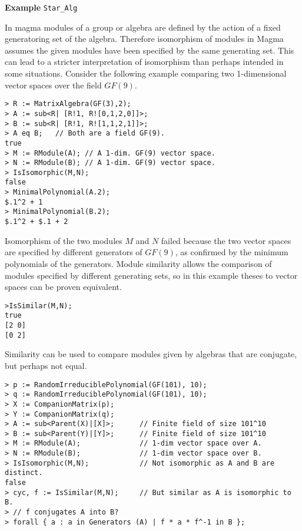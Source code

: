 \begin{framed}{\bf Example} {\tt Star\_Alg}\\
{\small 
In magma modules of a group or algebra are defined by the action of a fixed
generatoring set of the algebra.  Therefore isomorphism of modules in Magma 
assumes the given modules have been specified by the same generating set.
This can lead to a stricter interpretation of isomorphism than perhaps intended
in some situations.  Consider the following example comparing two
1-dimensional vector spaces over the field $GF(9)$.
\begin{lstlisting}[frame=single,basicstyle=\ttfamily\color{black!30!
teal},backgroundcolor=\color{white!70!gray}]
> R := MatrixAlgebra(GF(3),2);     
> A := sub<R| [R!1, R![0,1,2,0]]>;
> B := sub<R| [R!1, R![1,1,2,1]]>;
> A eq B;	// Both are a field GF(9).
true
> M := RModule(A); // A 1-dim. GF(9) vector space.
> N := RModule(B); // A 1-dim. GF(9) vector space.
> IsIsomorphic(M,N);
false
> MinimalPolynomial(A.2);
$.1^2 + 1
> MinimalPolynomial(B.2);
$.1^2 + $.1 + 2
\end{lstlisting}
Isomorphism of the two modules $M$ and $N$ failed because the two
vector spaces are specified by different generators of $GF(9)$, as confirmed
by the minimum polynomials of the generators.  Module similarity allows
the comparison of modules specified by different generating sets, so
in this example theses to vector spaces can be proven equivalent.
\begin{lstlisting}[frame=single,basicstyle=\ttfamily\color{black!30!
teal},backgroundcolor=\color{white!70!gray}]
>IsSimilar(M,N);
true 
[2 0]
[0 2]
\end{lstlisting}
Similarity can be used to compare modules given by algebras that are conjugate, but
perhaps not equal.  
\begin{lstlisting}[frame=single,basicstyle=\ttfamily\color{black!30!
teal},backgroundcolor=\color{white!70!gray}]
> p := RandomIrreduciblePolynomial(GF(101), 10); 
> q := RandomIrreduciblePolynomial(GF(101), 10); 
> X := CompanionMatrix(p);
> Y := CompanionMatrix(q);
> A := sub<Parent(X)|[X]>;      // Finite field of size 101^10
> B := sub<Parent(Y)|[Y]>;      // Finite field of size 101^10
> M := RModule(A);              // 1-dim vector space over A.
> N := RModule(B);              // 1-dim vector space over B.
> IsIsomorphic(M,N);            // Not isomorphic as A and B are distinct.
false
> cyc, f := IsSimilar(M,N);     // But similar as A is isomorphic to B.
> // f conjugates A into B?
> forall { a : a in Generators (A) | f * a * f^-1 in B };

\end{lstlisting}}
\end{framed}
